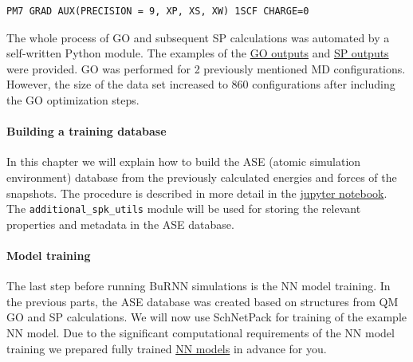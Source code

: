 \begin{lstlisting}[breaklines=true, breakatwhitespace=false]
PM7 GRAD AUX(PRECISION = 9, XP, XS, XW) 1SCF CHARGE=0
\end{lstlisting}

The whole process of GO and subsequent SP calculations was automated by a self-written Python module. The examples of the \href{https://github.com/LierB/gromos_tutorial_livecoms/tree/burnn_tutorial_rc/tutorial_files/t_06/train_dataset_tutorial/MOPAC_minimzation_files}{GO outputs} and \href{https://github.com/LierB/gromos_tutorial_livecoms/tree/burnn_tutorial_rc/tutorial_files/t_06/train_dataset_tutorial/QM_dataset_example}{SP outputs} were provided. GO was performed for 2 previously mentioned MD configurations. However, the size of the data set increased to 860 configurations after including the GO optimization steps.

\paragraph{Building a training database}
In this chapter we will explain how to build the ASE (atomic simulation environment) \cite{Larsen2017ASE} database from the previously calculated energies and forces of the snapshots. The procedure is described in more detail in the \href{https://github.com/LierB/gromos_tutorial_livecoms/blob/burnn_tutorial_rc/tutorial_files/t_06/train_dataset_tutorial/tutorial_v2.ipynb}{jupyter notebook}. The \texttt{additional\_spk\_utils} module will be used for storing the relevant properties and metadata in the ASE database. 



\paragraph{Model training}
The last step before running BuRNN simulations is the NN model training. In the previous parts, the ASE database was created based on structures from QM GO and SP calculations. We will now use SchNetPack for training of the example NN model. Due to the significant computational requirements of the NN model training we prepared fully trained \href{https://github.com/LierB/gromos_tutorial_livecoms/tree/burnn_tutorial_rc/tutorial_files/t_06/models}{NN models} in advance for you.

